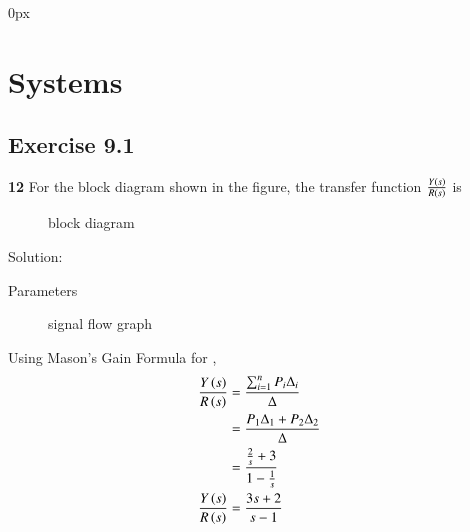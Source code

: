 \documentclass[journal,12pt,twocolumn]{IEEEtran}
\theoremstyle{remark}
\begin{document}
\parindent 0px


\vspace{3cm}

\title{}
\author{EE23BTECH11217 - Prajwal M$^{*}$
}
\maketitle
\newpage
\bigskip


\chapter{Systems}

\section*{Exercise 9.1}
\question
\noindent \textbf{12} \hspace{2pt}For the block diagram shown in the figure, the transfer function $\frac{Y\left(s\right)}{R\left(s\right)}$ is \\
\begin{figure}[h]
    \centering
    
    \caption{block diagram}
    \label{fig:9.1.12.1}
\end{figure}

Solution:\\
\solution
\fi
\begin{table}[h]
    \centering
    
    \caption{Parameters}
    \label{tab:9.1.12.1}
\end{table}

\begin{figure}[h]
    \centering
    
    \caption{signal flow graph}
    \label{fig: 9.1.12.2}
\end{figure}

Using Mason's Gain Formula for ,
\begin{align}
    \frac{Y\left(s\right)}{R\left(s\right)} & = \frac{{\sum_{i=1}^{n} P_i\Delta_i}}{{\Delta}}\\
    & = \frac{P_1\Delta_1 + P_2\Delta_2}{\Delta}\\
    & = \frac{\frac{2}{s} + 3}{1 - \frac{1}{s}}\\
    \frac{Y\left(s\right)}{R\left(s\right)} & = \frac{3s+2}{s-1}
\end{align}

\end{document}
